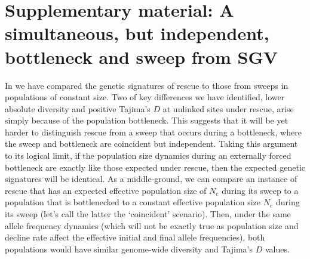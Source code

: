 \documentclass[]{article}
\begin{document}
\section*{Supplementary material: A simultaneous, but independent, bottleneck and sweep from SGV}
\label{sec:sweep+bottle_sup}

In  we have compared the genetic signatures of rescue to those from sweeps in populations of constant size. 
Two of key differences we have identified, lower absolute diversity and positive Tajima's $D$ at unlinked sites under rescue, arise simply because of the population bottleneck.
This suggests that it will be yet harder to distinguish rescue from a sweep that occurs during a bottleneck, where the sweep and bottleneck are coincident but independent.
Taking this argument to its logical limit, if the population size dynamics during an externally forced bottleneck are exactly like those expected under rescue, then the expected genetic signatures will be identical.
As a middle-ground, we can compare an instance of rescue that has an expected effective population size of $N_e$ during its sweep to a population that is bottlenecked to a constant effective population size $N_e$ during its sweep (let's call the latter the `coincident' scenario).
Then, under the same allele frequency dynamics (which will not be exactly true as population size and decline rate affect the effective initial and final allele frequencies), both populations would have similar genome-wide diversity and Tajima's $D$ values.
\end{document}
